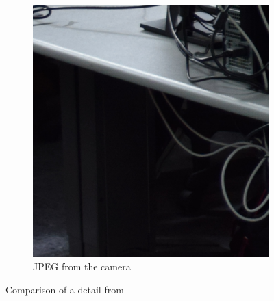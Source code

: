 \documentclass[a4paper,oneside]{article}
\begin{document}
\begin{figure}[htbp]
\begin{subfigure}{.33\textwidth}
  \caption{}
\end{subfigure}%
  \begin{subfigure}{.33\textwidth}
  \centering
  \includegraphics[width=.95\linewidth]{camera_students2_detail}
  \caption{JPEG from the camera}
\end{subfigure}
\caption{Comparison of a detail from }
\label{fig:dark_artifacts}
\end{figure}



\end{document}
